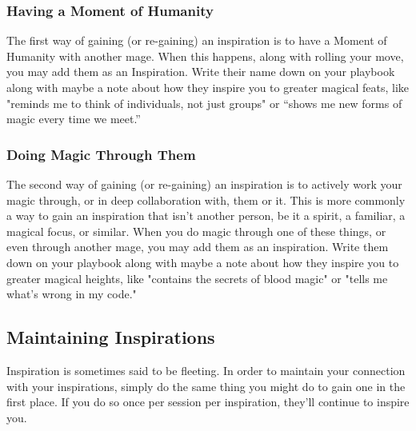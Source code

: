 \documentclass[
  oneside,
  statementpaper,
  9pt]{memoir}
\begin{document}
\hypertarget{having-a-moment-of-humanity}{%
\subsubsection{Having a Moment of
Humanity}\label{having-a-moment-of-humanity}}

\begin{Player}

The first way of gaining (or re-gaining) an inspiration is to have a Moment of Humanity with another mage. When this happens, along with rolling your move, you may add them as an Inspiration. Write their name down on your playbook along with maybe a note about how they inspire you to greater magical feats, like "reminds me to think of individuals, not just groups" or “shows me new forms of magic every time we meet.”

\end{Player}

\hypertarget{doing-magic-through-them}{%
\subsubsection{Doing Magic Through
Them}\label{doing-magic-through-them}}

\begin{Player}

The second way of gaining (or re-gaining) an inspiration is to actively work your magic through, or in deep collaboration with, them or it. This is more commonly a way to gain an inspiration that isn’t another person, be it a spirit, a familiar, a magical focus, or similar. When you do magic through one of these things, or even through another mage, you may add them as an inspiration. Write them down on your playbook along with maybe a note about how they inspire you to greater magical heights, like "contains the secrets of blood magic" or "tells me what's wrong in my code."

\end{Player}

\hypertarget{maintaining-inspirations}{%
\subsection{Maintaining Inspirations}\label{maintaining-inspirations}}

\begin{Player}

Inspiration is sometimes said to be fleeting. In order to maintain your connection with your inspirations, simply do the same thing you might do to gain one in the first place. If you do so once per session per inspiration, they’ll continue to inspire you.

\end{Player}
\end{document}
